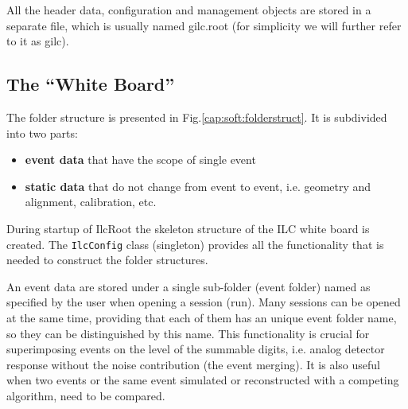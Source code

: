 \documentclass[12pt,a4paper,twoside]{article}
\begin{document}
{All the header data, configuration and management objects
are stored in a separate file, which is usually named gilc.root 
(for simplicity we will further refer to it as gilc).


\subsection{The ``White Board''}

The folder structure is presented in Fig.\ref{cap:soft:folderstruct}.
It is subdivided into two parts:
\begin{itemize}
\item \textbf{event data} that have the scope of single event 
\item \textbf{static data} that do not change from event to event, 
  i.e. geometry and alignment, calibration, etc.
\end{itemize}

During startup of IlcRoot the skeleton structure of the ILC white 
board is created.  The \texttt{IlcConfig} class (singleton) provides all the 
functionality that is needed to construct the folder structures.

An event data are stored under a single sub-folder (event folder) named as 
specified by the user when opening a session (run). Many sessions can be 
opened at the same time, providing that each of them has an unique event 
folder name, so they can be distinguished by this name. 
This functionality is crucial for superimposing events
on the level of the summable digits, i.e. analog detector response without the noise
contribution (the event merging). It is also useful when two events
or the same event simulated or reconstructed with a competing algorithm, 
need to be compared.

}
\end{document}
